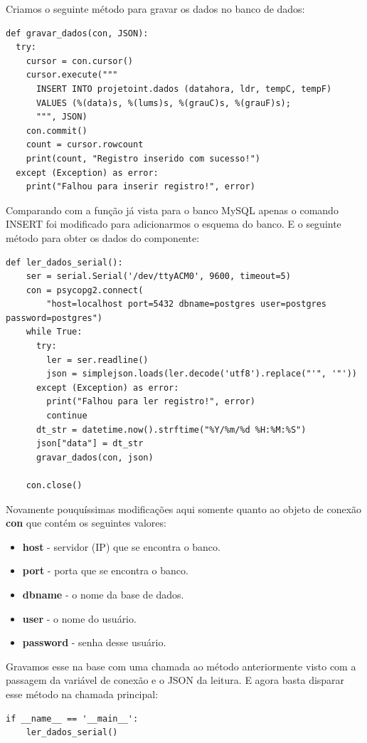 \documentclass[a4paper,11pt]{article}
\begin{document}
Criamos o seguinte método para gravar os dados no banco de dados:
\begin{lstlisting}[]
def gravar_dados(con, JSON):
  try:
    cursor = con.cursor()
    cursor.execute("""
      INSERT INTO projetoint.dados (datahora, ldr, tempC, tempF)
      VALUES (%(data)s, %(lums)s, %(grauC)s, %(grauF)s);
      """, JSON)
    con.commit()
    count = cursor.rowcount
    print(count, "Registro inserido com sucesso!")
  except (Exception) as error:
    print("Falhou para inserir registro!", error)
\end{lstlisting}

Comparando com a função já vista para o banco MySQL apenas o comando INSERT foi modificado para adicionarmos o esquema do banco. E o seguinte método para obter os dados do componente:
\begin{lstlisting}[]
  def ler_dados_serial():
    ser = serial.Serial('/dev/ttyACM0', 9600, timeout=5)
    con = psycopg2.connect(
        "host=localhost port=5432 dbname=postgres user=postgres password=postgres")    
    while True:
      try:
        ler = ser.readline()
        json = simplejson.loads(ler.decode('utf8').replace("'", '"'))
      except (Exception) as error:
        print("Falhou para ler registro!", error)
        continue
      dt_str = datetime.now().strftime("%Y/%m/%d %H:%M:%S")
      json["data"] = dt_str
      gravar_dados(con, json)

    con.close()
\end{lstlisting}

Novamente pouquíssimas modificações aqui somente quanto ao objeto de conexão \textbf{con} que contém os seguintes valores: \vspace{-1em}
\begin{itemize}[nolistsep]
	\item \textbf{host} - servidor (IP) que se encontra o banco.
	\item \textbf{port} - porta que se encontra o banco.
	\item \textbf{dbname} - o nome da base de dados.
	\item \textbf{user} - o nome do usuário.
	\item \textbf{password} - senha desse usuário.
\end{itemize}

Gravamos esse na base com uma chamada ao método anteriormente visto com a passagem da variável de conexão e o JSON da leitura. E agora basta disparar esse método na chamada principal:
\begin{lstlisting}[]
  if __name__ == '__main__':
    ler_dados_serial()
\end{lstlisting}
\end{document}
